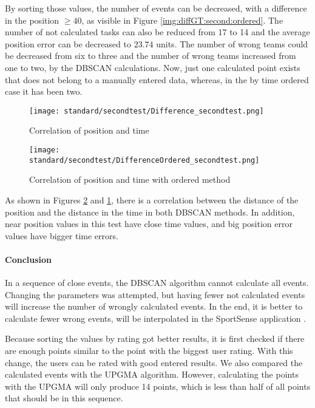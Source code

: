 By sorting those values, the number of events can be decreased, with a difference in the position $\ge 40$, as visible in Figure \ref{img:diffGT:second:ordered}. 
The number of not calculated tasks can also be reduced from 17 to 14 and the average position error can be decreased to $23.74$ units.
The number of wrong teams could be decreased from six to three and the number of wrong teams increased from one to two, by the DBSCAN calculations.
Now, just one calculated point exists that does not belong to a manually entered data, whereas, in the by time ordered case it has been two.


\begin{figure}[H]
    \centering
    \texttt{[image: standard/secondtest/Difference\_secondtest.png]}
    \caption{Correlation of position and time}
    \label{img:correlation:second}
\end{figure}

\begin{figure}[H]
    \centering
    \texttt{[image: standard/secondtest/DifferenceOrdered\_secondtest.png]}
    \caption{Correlation of position and time with ordered method}
    \label{img:correlation:ordered:second}
\end{figure}

As shown in Figures \ref{img:correlation:ordered:second} and \ref{img:correlation:second}, there is a correlation between the distance of the position and the distance in the time in both DBSCAN methods. In addition, near position values in this test have close time values, and big position error values have bigger time errors.

\paragraph{Conclusion}
In a sequence of close events, the DBSCAN algorithm cannot calculate all events. Changing the parameters was attempted, but having fewer not calculated events will increase the number of wrongly calculated events.
In the end, it is better to calculate fewer wrong events, will be interpolated in the SportSense application \cite{AlKabary:2013}.

Because sorting the values by rating got better results, it is first checked if there are enough points similar to the point with the biggest user rating. With this change, the users can be rated with good entered results.
We also compared the calculated events with the UPGMA algorithm. However, calculating the points with the UPGMA will only produce 14 points, which is less than half of all points that should be in this sequence.



